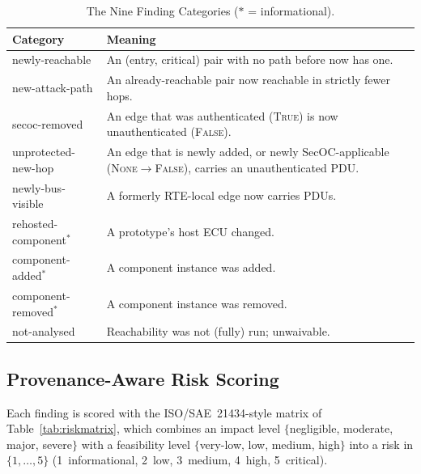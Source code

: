 \documentclass[journal]{IEEEtran}
\begin{document}
\begin{table}[t]
\centering
\caption{The Nine Finding Categories ($\ast$ = informational).}
\label{tab:categories}
\renewcommand{\arraystretch}{1.15}
\begin{tabular}{@{}p{2.55cm}p{5.0cm}@{}}
\toprule
\textbf{Category} & \textbf{Meaning} \\
\midrule
newly-reachable        & An (entry, critical) pair with no path before now has one. \\
new-attack-path        & An already-reachable pair now reachable in strictly fewer hops. \\
secoc-removed          & An edge that was authenticated (\textsc{True}) is now unauthenticated (\textsc{False}). \\
unprotected-new-hop    & An edge that is newly added, or newly SecOC-applicable (\textsc{None}$\to$\textsc{False}), carries an unauthenticated PDU. \\
newly-bus-visible      & A formerly RTE-local edge now carries PDUs. \\
rehosted-component$^\ast$   & A prototype's host ECU changed. \\
component-added$^\ast$      & A component instance was added. \\
component-removed$^\ast$    & A component instance was removed. \\
not-analysed           & Reachability was not (fully) run; unwaivable. \\
\bottomrule
\end{tabular}
\end{table}

\subsection{Provenance-Aware Risk Scoring}
\label{subsec:severity}
Each finding is scored with the ISO/SAE~21434-style matrix of
Table~\ref{tab:riskmatrix}, which combines an impact level
$\{$negligible, moderate, major, severe$\}$ with a feasibility level
$\{$very-low, low, medium, high$\}$ into a risk in $\{1,\dots,5\}$
(1~informational, 2~low, 3~medium, 4~high, 5~critical).
\end{document}
